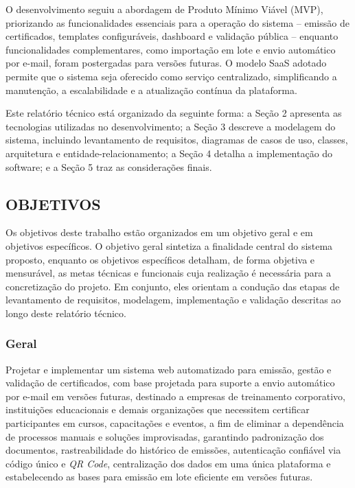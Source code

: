 \documentclass[12pt,openright,oneside,a4paper]{article}
\begin{document}
O desenvolvimento seguiu a abordagem de Produto Mínimo Viável (MVP), priorizando as funcionalidades essenciais para a operação do sistema -- emissão de certificados, templates configuráveis, dashboard e validação pública -- enquanto funcionalidades complementares, como importação em lote e envio automático por e-mail, foram postergadas para versões futuras. O modelo SaaS adotado permite que o sistema seja oferecido como serviço centralizado, simplificando a manutenção, a escalabilidade e a atualização contínua da plataforma.

Este relatório técnico está organizado da seguinte forma: a Seção 2 apresenta as tecnologias utilizadas no desenvolvimento; a Seção 3 descreve a modelagem do sistema, incluindo levantamento de requisitos, diagramas de casos de uso, classes, arquitetura e entidade-relacionamento; a Seção 4 detalha a implementação do software; e a Seção 5 traz as considerações finais.

\subsection{OBJETIVOS}\label{sec:objetivos}

Os objetivos deste trabalho estão organizados em um objetivo geral e em objetivos específicos. O objetivo geral sintetiza a finalidade central do sistema proposto, enquanto os objetivos específicos detalham, de forma objetiva e mensurável, as metas técnicas e funcionais cuja realização é necessária para a concretização do projeto. Em conjunto, eles orientam a condução das etapas de levantamento de requisitos, modelagem, implementação e validação descritas ao longo deste relatório técnico.

\subsubsection{Geral}\label{sec:objetivo-geral}

Projetar e implementar um sistema web automatizado para emissão, gestão e validação de certificados, com base projetada para suporte a envio automático por e-mail em versões futuras, destinado a empresas de treinamento corporativo, instituições educacionais e demais organizações que necessitem certificar participantes em cursos, capacitações e eventos, a fim de eliminar a dependência de processos manuais e soluções improvisadas, garantindo padronização dos documentos, rastreabilidade do histórico de emissões, autenticação confiável via código único e \textit{QR Code}, centralização dos dados em uma única plataforma e estabelecendo as bases para emissão em lote eficiente em versões futuras.
\end{document}

